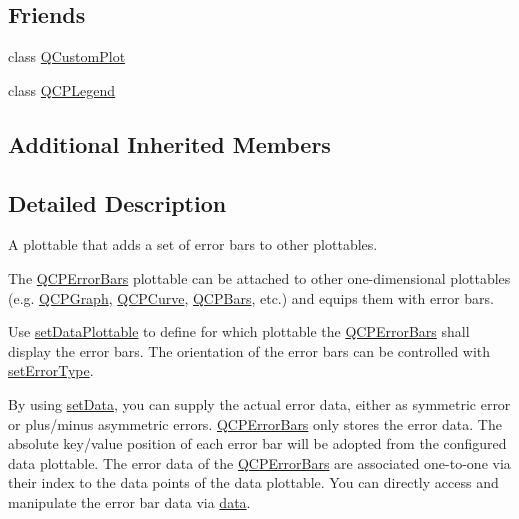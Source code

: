 \subsection*{Friends}
\begin{DoxyCompactItemize}
\item 
class \mbox{\hyperlink{class_q_c_p_error_bars_a1cdf9df76adcfae45261690aa0ca2198}{Q\+Custom\+Plot}}
\item 
class \mbox{\hyperlink{class_q_c_p_error_bars_a8429035e7adfbd7f05805a6530ad5e3b}{Q\+C\+P\+Legend}}
\end{DoxyCompactItemize}
\subsection*{Additional Inherited Members}


\subsection{Detailed Description}
A plottable that adds a set of error bars to other plottables. 



The \mbox{\hyperlink{class_q_c_p_error_bars}{Q\+C\+P\+Error\+Bars}} plottable can be attached to other one-\/dimensional plottables (e.\+g. \mbox{\hyperlink{class_q_c_p_graph}{Q\+C\+P\+Graph}}, \mbox{\hyperlink{class_q_c_p_curve}{Q\+C\+P\+Curve}}, \mbox{\hyperlink{class_q_c_p_bars}{Q\+C\+P\+Bars}}, etc.) and equips them with error bars.

Use \mbox{\hyperlink{class_q_c_p_error_bars_aabb42a964cfbf780cd1c79850c7cd989}{set\+Data\+Plottable}} to define for which plottable the \mbox{\hyperlink{class_q_c_p_error_bars}{Q\+C\+P\+Error\+Bars}} shall display the error bars. The orientation of the error bars can be controlled with \mbox{\hyperlink{class_q_c_p_error_bars_af0af493d454a8f3a0908830160680d2b}{set\+Error\+Type}}.

By using \mbox{\hyperlink{class_q_c_p_error_bars_a92b1980003255f5f7c05407a4d92aabc}{set\+Data}}, you can supply the actual error data, either as symmetric error or plus/minus asymmetric errors. \mbox{\hyperlink{class_q_c_p_error_bars}{Q\+C\+P\+Error\+Bars}} only stores the error data. The absolute key/value position of each error bar will be adopted from the configured data plottable. The error data of the \mbox{\hyperlink{class_q_c_p_error_bars}{Q\+C\+P\+Error\+Bars}} are associated one-\/to-\/one via their index to the data points of the data plottable. You can directly access and manipulate the error bar data via \mbox{\hyperlink{class_q_c_p_error_bars_aeebd1b14f4c3573565efafd514988813}{data}}.

